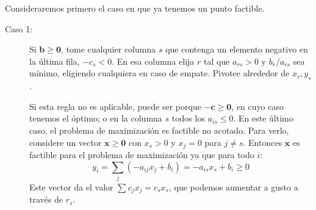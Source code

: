   Consideraremos primero el caso en que ya tenemos un punto factible.
  \begin{description}
  \item[Caso 1:]
    Si \(\mathbf{b} \ge \mathbf{0}\),
    tome cualquier columna \(s\)
    que contenga un elemento negativo en la última fila,
    \(-c_s < 0\).
    En esa columna elija \(r\)
    tal que \(a_{r s} > 0\) y \(b_r / a_{r s}\) sea mínimo,
    eligiendo cualquiera en caso de empate.
    Pivotee alrededor de \(x_r, y_s\).

    Si esta regla no es aplicable,
    puede ser porque \(-\mathbf{c} \ge \mathbf{0}\),
    en cuyo caso tenemos el óptimo;
    o en la columna \(s\) todos los \(a_{i s} \le 0\).
    En este último caso,
    el problema de maximización es factible no acotado.
    Para verlo,
    considere un vector \(\mathbf{x} \ge \mathbf{0}\)
    con \(x_s > 0\) y \(x_j = 0\) para \(j \ne s\).
    Entonces \(\mathbf{x}\) es factible para el problema de maximización
    ya que para todo \(i\):
    \begin{equation*}
      y_i
        =   \sum_j (-a_{i j} x_j + b_i)
        =   -a_{i s} x_s + b_i
        \ge 0
    \end{equation*}
    Este vector da el valor \(\sum c_j x_j = c_s x_s\),
    que podemos aumentar a gusto a través de \(r_s\).


\end{description}
